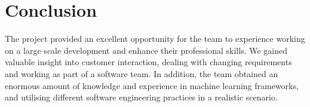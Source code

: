 \documentclass{l3proj}
\begin{document}



\section{Conclusion}
\label{sec:conclusions}
The project provided an excellent opportunity for the team to experience working on a large scale development and enhance their professional skills. We gained valuable insight into customer interaction, dealing with changing requirements and working as part of a software team. In addition, the team obtained an enormous amount of knowledge and experience in machine learning frameworks, and utilising different software engineering practices in a realistic scenario. 
\end{document}
